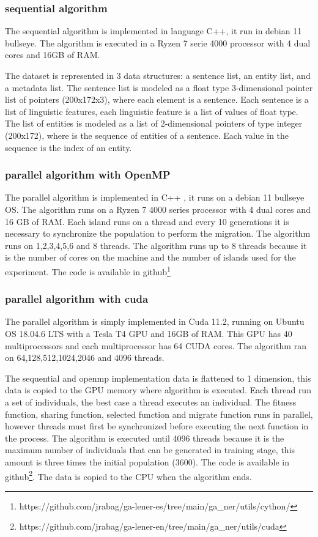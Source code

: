 \documentclass{IEEEtran}
\begin{document}
\subsubsection{sequential algorithm}

The sequential algorithm is implemented in language C++, it run in debian 11 bullseye. The algorithm is executed in a Ryzen 7 serie 4000 processor with 4 dual cores and 16GB of RAM.

The dataset is represented in 3 data structures: a sentence list, an entity list, and a metadata list.
The sentence list is modeled as a float type 3-dimensional pointer list of pointers (200x172x3), where each element is a sentence. Each sentence is a list of linguistic features, each linguistic feature is a list of values of float type. The list of entities is modeled as a list of 2-dimensional pointers of type integer (200x172), where is the sequence of entities of a sentence. Each value in the sequence is the index of an entity.


\subsubsection{parallel algorithm with OpenMP}

The parallel algorithm is implemented in C++ , it runs on a debian 11 bullseye OS. The algorithm runs on a Ryzen 7 4000 series processor with 4 dual cores and 16 GB of RAM. Each island runs on a thread and every 10 generations it is necessary to synchronize the population to perform the migration. The algorithm runs on 1,2,3,4,5,6 and 8 threads. The algorithm runs up to 8 threads because it is the number of cores on the machine and the number of islands used for the experiment. The code is available in github\footnote{https://github.com/jrabag/ga\--lener\--es/tree/main/ga\_ner/utils/cython/}


\subsubsection{parallel algorithm with cuda}

The parallel algorithm is simply implemented in Cuda 11.2, running on Ubuntu OS 18.04.6 LTS with a Tesla T4 GPU and 16GB of RAM. This GPU has 40 multiprocessors and each multiprocessor has 64 CUDA cores. The algorithm ran on 64,128,512,1024,2046 and 4096 threads.

The sequential and openmp implementation data is flattened to 1 dimension, this data is copied to the GPU memory where algorithm is executed. Each thread run a set of individuals, the best case a thread executes an individual. The fitness function, sharing function, selected function and migrate function runs in parallel, however threads must first be synchronized before executing the next function in the process. The algorithm is executed until 4096 threads because it is the maximum number of individuals that can be generated in training stage, this amount is three times the initial population (3600). The code is available in github\footnote{https://github.com/jrabag/ga\--lener\--en/tree/main/ga\_ner/utils/cuda}. The data is copied to the CPU when the algorithm ends.
\end{document}
